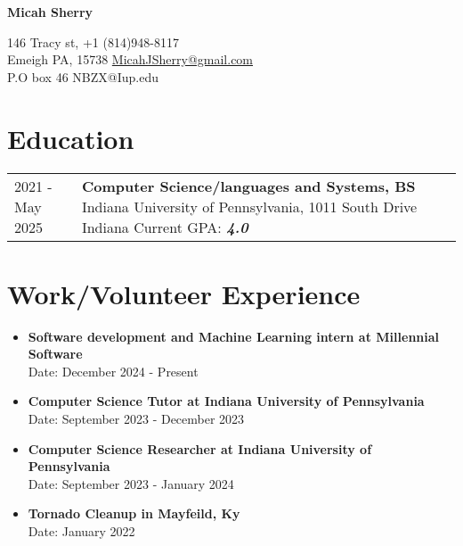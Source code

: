 \documentclass[12pt]{article}
\begin{document}
\begin{center}
     \Huge{\textbf{Micah Sherry}}
\end{center}
146 Tracy st, \hfill +1 (814)948-8117\\
Emeigh PA, 15738 \hfill \href{mailto:MicahJSherry@gmail.com}{MicahJSherry@gmail.com} \\ 
P.O box 46 \hfill {NBZX@Iup.edu}



\section{Education}
\begin{tabular}{ l p{15in} }
    2021 - May 2025 & \textbf{Computer Science/languages and Systems, BS} \newline Indiana University of Pennsylvania, 1011 South Drive Indiana 
    \newline Current GPA: \textbf{\textit{4.0}} \\
     
\end{tabular}


\section{Work/Volunteer Experience}
\begin{itemize}
    \itemsep=-0em
    \item \textbf{Software development and Machine Learning intern at Millennial Software} \\ 
Date: December 2024 - Present
    \item \textbf{Computer Science Tutor at Indiana University of Pennsylvania} \\ 
Date: September 2023 - December 2023 
    \item \textbf{Computer Science Researcher at Indiana University of Pennsylvania} \\ 
Date: September 2023 - January 2024 
    \item \textbf{Tornado Cleanup in Mayfeild, Ky} \\ 
Date: January 2022
 

\end{itemize}
\end{document}
